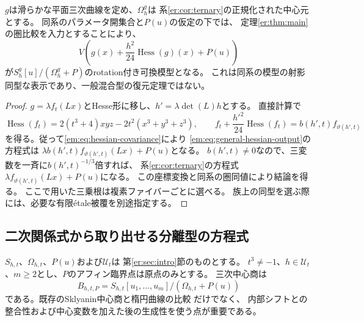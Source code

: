 \begin{corollary}[一般の滑らかな一ブロックの候補式]
\label{em:cor:hessian-reconstruction}
$g$は滑らかな平面三次曲線を定め、$\Omega_h^g$は
系\ref{er:cor:ternary}の正規化された中心元とする。
同系のパラメータ開集合と$P(u)$の仮定の下では、
定理\ref{er:thm:main}の圏比較を入力とすることにより、
\begin{equation}\label{em:eq:general-hessian-output}
 V\left(g(x)+\frac{h^2}{24}\operatorname{Hess}(g)(x)+P(u)\right)
\end{equation}
が$S_h^g[u]/(\Omega_h^g+P)$のrotation付き可換模型となる。
これは同系の模型の射影同型な表示であり、一般混合型の復元定理ではない。
\end{corollary}
\begin{proof}
$g=\lambda f_t(Lx)$とHesse形に移し、$h'=\lambda\det(L)h$とする。
直接計算で
\[
 \operatorname{Hess}(f_t)=
 2(t^3+4)xyz-2t^2(x^3+y^3+z^3),\qquad
 f_t+\frac{h'^2}{24}\operatorname{Hess}(f_t)
 =b(h',t) f_{\vartheta(h',t)}
\]
を得る。従って\eqref{em:eq:hessian-covariance}により
\eqref{em:eq:general-hessian-output}の方程式は
$\lambda b(h',t) f_{\vartheta(h',t)}(Lx)+P(u)$となる。
$b(h',t)\ne0$なので、三変数を一斉に$b(h',t)^{-1/3}$倍すれば、
系\ref{er:cor:ternary}の方程式
$\lambda f_{\vartheta(h',t)}(Lx)+P(u)$になる。
この座標変換と同系の圏同値により結論を得る。
ここで用いた三乗根は複素ファイバーごとに選べる。
族上の同型を選ぶ際には、必要な有限\'etale被覆を別途指定する。
\end{proof}

\subsection{二次関係式から取り出せる分離型の方程式}

$S_{h,t}$、$\Omega_{h,t}$、$P(u)$および$\mathscr U_t$は
第\ref{er:sec:intro}節のものとする。
$t^3\ne-1$、$h\in\mathscr U_t$、$m\ge2$とし、$P$のアフィン臨界点は原点のみとする。
三次中心商は
\[
 B_{h,t,P}=S_{h,t}[u_1,\ldots,u_m]/(\Omega_{h,t}+P(u))
\]
である。既存のSklyanin中心商と楕円曲線の比較
\cite[pp.~20--21]{SmithTate}\cite[Sections 3.5--3.6]{EG}だけでなく、
内部シフトとの整合性および中心変数を加えた後の生成性を使う点が重要である。

